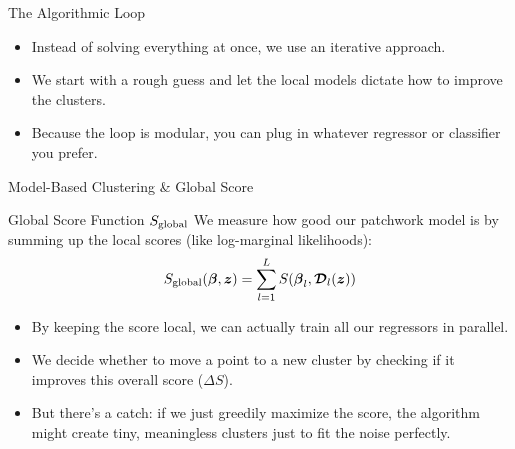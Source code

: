 \begin{frame}{The Algorithmic Loop}
    \centering
    \vspace{0.3cm}
    
    \vspace{0.5cm}
    \begin{itemize}
        \item Instead of solving everything at once, we use an iterative approach.
        \item We start with a rough guess and let the local models dictate how to improve the clusters.
        \item Because the loop is modular, you can plug in whatever regressor or classifier you prefer.
    \end{itemize}
\end{frame}

\begin{frame}{Model-Based Clustering \& Global Score}
    \begin{block}{Global Score Function $S_{\mathrm{global}}$}
        We measure how good our patchwork model is by summing up the local scores (like log-marginal likelihoods):
        \begin{equation}
            S_{\mathrm{global}}(\boldsymbol{\beta}, \boldsymbol{z}) = \sum_{l=1}^L S(\boldsymbol{\beta}_l, \boldsymbol{\mathcal{D}}_l(\boldsymbol{z}))
        \end{equation}
    \end{block}
    
    \begin{itemize}
        \item By keeping the score local, we can actually train all our regressors in parallel.
        \item We decide whether to move a point to a new cluster by checking if it improves this overall score ($\Delta S$).
        \item But there's a catch: if we just greedily maximize the score, the algorithm might create tiny, meaningless clusters just to fit the noise perfectly.
    \end{itemize}
\end{frame}

